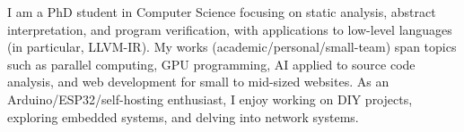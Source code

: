 
\begin{cvparagraph}
    I am a PhD student in Computer Science focusing on static analysis,
    abstract interpretation, and program verification, with applications to
    low-level languages (in particular, LLVM-IR).
    My works (academic/personal/small-team) span topics such as parallel
    computing, GPU programming, AI applied to source code analysis, and web
    development for small to mid-sized websites.
    As an Arduino/ESP32/self-hosting enthusiast, I enjoy working on DIY
    projects, exploring embedded systems, and delving into network systems.
\end{cvparagraph}
